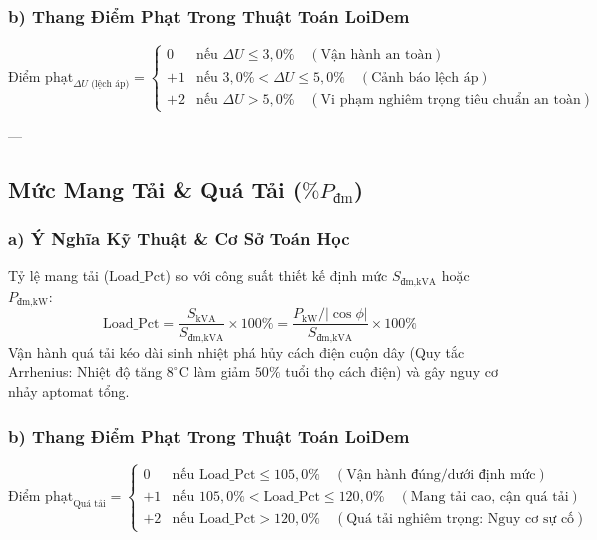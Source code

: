 \documentclass[12pt,a4paper]{article}
\begin{document}
\subsubsection{b) Thang Điểm Phạt Trong Thuật Toán LoiDem}
\begin{equation}
  \text{Điểm phạt}_{\Delta U \text{ (lệch áp)}} = 
  \begin{cases} 
    0 & \text{nếu } \Delta U \le 3{,}0\% \quad (\text{Vận hành an toàn}) \\
    +1 & \text{nếu } 3{,}0\% < \Delta U \le 5{,}0\% \quad (\text{Cảnh báo lệch áp}) \\
    +2 & \text{nếu } \Delta U > 5{,}0\% \quad (\text{Vi phạm nghiêm trọng tiêu chuẩn an toàn})
  \end{cases}
\end{equation}

---

\subsection{\texorpdfstring{Mức Mang Tải \& Quá Tải ($\%P_{\text{đm}}$)}{Mức Mang Tải & Quá Tải (phần trăm P định mức)}}

\subsubsection{a) Ý Nghĩa Kỹ Thuật \& Cơ Sở Toán Học}
Tỷ lệ mang tải ($\text{Load\_Pct}$) so với công suất thiết kế định mức $S_{\text{đm,kVA}}$ hoặc $P_{\text{đm,kW}}$:
\begin{equation}
  \text{Load\_Pct} = \frac{S_{\mathrm{kVA}}}{S_{\text{đm,kVA}}} \times 100\% = \frac{P_{\mathrm{kW}} / |\cos\phi|}{S_{\text{đm,kVA}}} \times 100\%
\end{equation}
Vận hành quá tải kéo dài sinh nhiệt phá hủy cách điện cuộn dây (Quy tắc Arrhenius: Nhiệt độ tăng $8^\circ\mathrm{C}$ làm giảm $50\%$ tuổi thọ cách điện) và gây nguy cơ nhảy aptomat tổng.

\subsubsection{b) Thang Điểm Phạt Trong Thuật Toán LoiDem}
\begin{equation}
  \text{Điểm phạt}_{\text{Quá tải}} = 
  \begin{cases} 
    0 & \text{nếu } \text{Load\_Pct} \le 105{,}0\% \quad (\text{Vận hành đúng/dưới định mức}) \\
    +1 & \text{nếu } 105{,}0\% < \text{Load\_Pct} \le 120{,}0\% \quad (\text{Mang tải cao, cận quá tải}) \\
    +2 & \text{nếu } \text{Load\_Pct} > 120{,}0\% \quad (\text{Quá tải nghiêm trọng: Nguy cơ sự cố})
  \end{cases}
\end{equation}
\end{document}

